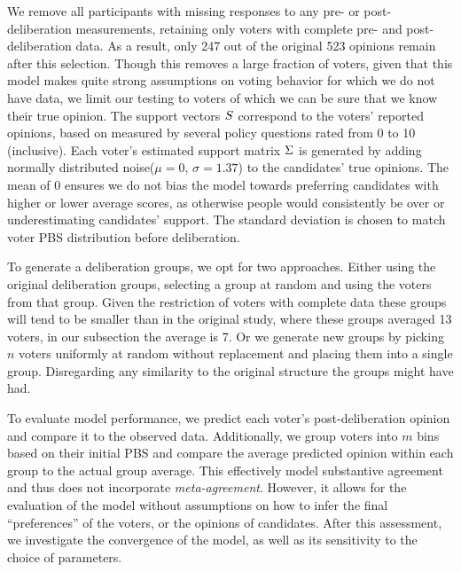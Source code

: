We remove all participants with missing responses to any pre- or
post-deliberation measurements, retaining only voters with complete pre- and
post-deliberation data. As a result, only 247 out of the original 523 opinions
remain after this selection. Though this removes a large fraction of voters,
given that this model makes quite strong assumptions on voting behavior for
which we do not have data, we limit our testing to voters of which we can be
sure that we know their true opinion. The support vectors $S$ correspond
to the voters' reported opinions, based on measured by several policy questions
rated from 0 to 10 (inclusive). Each voter's estimated support matrix
$\Sigma$ is generated by adding normally distributed noise($\mu=0$, $\sigma=1.37$) to the
candidates' true opinions. The mean of 0 ensures we do not bias the model towards
preferring candidates with higher or lower average scores, as otherwise people
would consistently be over or underestimating candidates' support. The standard
deviation is chosen to match voter PBS distribution before
deliberation.


To generate a deliberation groups, we opt for two approaches. Either using the
original deliberation groups, selecting a group at random and using the voters
from that group. Given the restriction of voters with complete data these
groups will tend to be smaller than in the original study, where these groups
averaged 13 voters, in our subsection the average is 7. Or we generate new
groups by picking $n$ voters uniformly at random without replacement and
placing them into a single group. Disregarding any similarity to the original
structure the groups might have had.

To evaluate model performance, we predict each voter's post-deliberation
opinion and compare it to the observed data. Additionally, we group voters into
$m$ bins based on their initial PBS and compare the average predicted opinion
within each group to the actual group average. This effectively model
substantive agreement and thus does not incorporate \textit{meta-agreement}.
However, it allows for the evaluation of the model without assumptions on how
to infer the final ``preferences'' of the voters, or the opinions of
candidates. After this assessment, we investigate the convergence of the model,
as well as its sensitivity to the choice of parameters.

